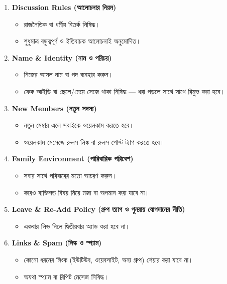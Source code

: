 \documentclass[12pt]{article}
\begin{document}
\begin{enumerate}[label=\arabic*., itemsep=10pt, leftmargin=*]
    \item \textbf{Discussion Rules (আলোচনার নিয়ম)}
    \begin{itemize}[label=$\diamond$]
        \item রাজনৈতিক বা ধর্মীয় বিতর্ক নিষিদ্ধ।
        \item শুধুমাত্র বন্ধুত্বপূর্ণ ও ইতিবাচক আলোচনাই অনুমোদিত।
    \end{itemize}

    \item \textbf{Name \& Identity (নাম ও পরিচয়)}
    \begin{itemize}[label=$\diamond$]
        \item নিজের আসল নাম বা পদ ব্যবহার করুন।
        \item ফেক আইডি বা ছেলে/মেয়ে সেজে থাকা নিষিদ্ধ — ধরা পড়লে সাথে সাথে রিমুভ করা হবে।
    \end{itemize}

    \item \textbf{New Members (নতুন সদস্য)}
    \begin{itemize}[label=$\diamond$]
        \item নতুন মেম্বার এলে সবাইকে ওয়েলকাম করতে হবে।
        \item ওয়েলকাম মেসেজে রুলস লিঙ্ক বা রুলস পোস্ট ট্যাগ করতে হবে।
    \end{itemize}

    \item \textbf{Family Environment (পারিবারিক পরিবেশ)}
    \begin{itemize}[label=$\diamond$]
        \item সবার সাথে পরিবারের মতো আচরণ করুন।
        \item কারও ব্যক্তিগত বিষয় নিয়ে মজা বা অপমান করা যাবে না।
    \end{itemize}

    \item \textbf{Leave \& Re-Add Policy (গ্রুপ ত্যাগ ও পুনরায় যোগদানের নীতি)}
    \begin{itemize}[label=$\diamond$]
        \item একবার লিভ নিলে দ্বিতীয়বার অ্যাড করা হবে না।
    \end{itemize}

    \item \textbf{Links \& Spam (লিঙ্ক ও স্প্যাম)}
    \begin{itemize}[label=$\diamond$]
        \item কোনো ধরনের লিংক (ইউটিউব, ওয়েবসাইট, অন্য গ্রুপ) শেয়ার করা যাবে না।
        \item অযথা স্প্যাম বা রিপিট মেসেজ নিষিদ্ধ।
    \end{itemize}


\end{enumerate}
\end{document}
